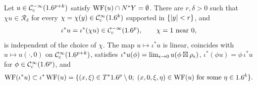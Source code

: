 \begin{theorem}[Restriction]\label{microlocal:thm:restriction}
  Let $u\in\mathcal{C}^{-\infty}_{\mathrm{c}}(1.6^{p+k})$ satisfy $\operatorname{WF}(u)\cap N^*Y=\emptyset$. There are
  $r,\delta>0$ such that $\chi u\in\mathcal R_\delta$ for every
  $\chi=\chi(y)\in\mathcal{C}^\infty_{\mathrm{c}}(1.6^k)$ supported in $\{\lvert y\rvert<r\}$, and
  \begin{equation*}
    \iota^*u=\iota^*(\chi u)\in\mathcal{C}^{-\infty}_{\mathrm{c}}(1.6^p),\qquad\chi=1\text{ near }0,
  \end{equation*}
  is independent of the choice of $\chi$. The map $u\mapsto\iota^*u$ is
  linear, coincides with $u\mapsto u(\cdot,0)$ on $\mathcal{C}^\infty_{\mathrm{c}}(1.6^{p+k})$, satisfies
  $\iota^*u(\phi)=\lim_{\epsilon\to0}u(\phi\boxtimes\rho_\epsilon)$,
  $\iota^*(\phi u)=\phi\,\iota^*u$ for $\phi\in\mathcal{C}^\infty_{\mathrm{c}}(1.6^p)$, and
  \begin{equation*}
    \operatorname{WF}(\iota^*u)\subset\iota^*\operatorname{WF}(u)=
    \{(x,\xi)\in T^*1.6^p\setminus0;\ (x,0,\xi,\eta)\in\operatorname{WF}(u)\text{ for some }\eta\in1.6^k\}.
  \end{equation*}
\end{theorem}
